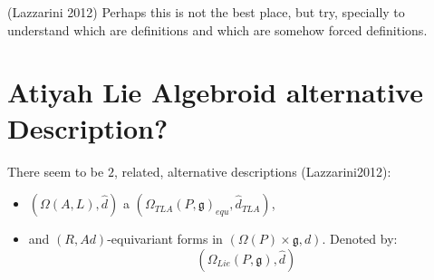 (Lazzarini 2012) Perhaps this is not the best place, but try, specially to understand which are definitions and which are somehow forced definitions.

\section{Atiyah Lie Algebroid alternative Description?}

There seem to be $2$, related, alternative descriptions (Lazzarini2012):
    
    \begin{itemize}
        
    \item $(\Omega(A, L), \hat d)$ a $(\Omega_{TLA}(P, \mathfrak g)_{equ}, \hat d_{TLA})$,
    
    \item and $(R, Ad)$-equivariant forms in $(\Omega(P) \times \mathfrak g, d)$. Denoted by: \[ (\Omega_{Lie}(P, \mathfrak g), \hat d) \]
        
    \end{itemize}

